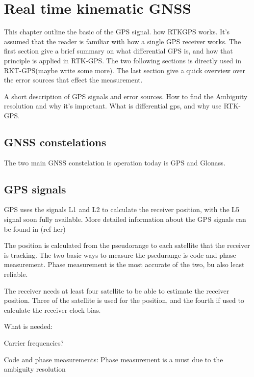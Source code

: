 
\chapter{Real time kinematic GNSS}
This chapter outline the basic of the GPS signal. how RTKGPS works. It's assumed that the reader is familiar with how a single GPS receiver works. The first section give a brief summary on what differential GPS is, and how that principle is applied in RTK-GPS. The two following sections is directly used in RKT-GPS(maybe write some more). The last section give a quick overview over the error sources that effect the measurement.

A short description of GPS signals and error sources. How to find the Ambiguity resolution and why it's important. What is differential gps, and why use RTK-GPS.

\section{GNSS constelations}
The two main GNSS constelation is operation today is GPS and Glonass. 
\section{GPS signals}
GPS uses the signals L1 and L2 to calculate the receiver position, with the L5 signal soon fully available. More detailed information about the GPS signals can be found in (ref her)

The position is calculated from the pseudorange to each satellite that the receiver is tracking. The two basic ways to measure the psedurange is code and phase measurement. Phase measurement is the most accurate of the two, bu also least reliable.

The receiver needs at least four satellite to be able to estimate the receiver position. Three of the satellite is used for the position, and the fourth if used to calculate the receiver clock bias.

What is needed:

Carrier frequencies?

Code and phase measurements: Phase measurement is a must due to the ambiguity resolution

